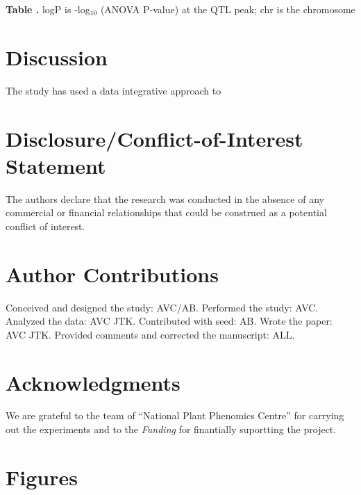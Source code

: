 \documentclass{frontiersSCNS} %
\begin{document}
\begin{table}[ht]
 \textbf{\label{table:qtl} Table .}{ logP is -log$_{10}$ (ANOVA P-value) at the QTL peak; chr is the chromosome}\\

\end{table}


\section{Discussion}

The study has used a data integrative approach to 
\section*{Disclosure/Conflict-of-Interest Statement}


The authors declare that the research was conducted in the absence of any commercial or financial relationships that could be construed as a potential conflict of interest.

\section*{Author Contributions}

Conceived and designed the study: AVC/AB. Performed the study: AVC. Analyzed the data: AVC JTK. Contributed with seed: AB. Wrote the paper: AVC JTK. Provided comments and corrected the manuscript: ALL.

\section*{Acknowledgments}
 We are grateful to the team of “National Plant Phenomics Centre” for carrying out the experiments and to the 
\textit{Funding\textcolon} for finantially suportting the project.






\section*{Figures}
\end{document}
